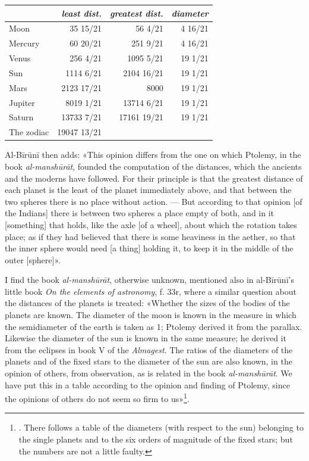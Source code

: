 \documentclass[11pt]{article}
\newcommand{\Pg}[1]{\marginpar{\footnotesize\color{gray}#1}}
\begin{document}
\Pg{I 288}\begin{center}\small\begin{tabular}{lrrr}
 & \emph{least dist.} & \emph{greatest dist.} & \emph{diameter} \\
\midrule
Moon & 35 15/21 & 56 4/21 & 4 16/21 \\
Mercury & 60 20/21 & 251 9/21 & 4 16/21 \\
Venus & 256 4/21 & 1095 5/21 & 19 1/21 \\
Sun & 1114 6/21 & 2104 16/21 & 19 1/21 \\
Mars & 2123 17/21 & 8000 & 19 1/21 \\
Jupiter & 8019 1/21 & 13714 6/21 & 19 1/21 \\
Saturn & 13733 7/21 & 17161 19/21 & 19 1/21 \\
The zodiac & 19047 13/21\footnotemark{} &  &  \\
\end{tabular}\end{center}
\addtocounter{footnote}{-1}
\par Al-Bīrūnī then adds: «This opinion differs from the one on which Ptolemy, in the book \emph{al-manshūrāt}, founded the computation of the distances, which the ancients and the moderns have followed. For their principle is that the greatest distance of each planet is the least of the planet immediately above, and that between the two spheres there is no place without action. — But according to that opinion [of the Indians] there is between two spheres a place empty of both, and in it [something] that holds, like the axle [of a wheel], about which the rotation takes place; as if they had believed that there is some heaviness in the aether, so that the inner sphere would need [a thing] holding it, to keep it in the middle of the outer [sphere]».\par
\par I find the book \emph{al-manshūrāt}, otherwise unknown, mentioned also in al-Bīrūnī's little book \emph{On the elements of astronomy}, f. 33r, where a similar question about the distances of the planets is treated: «Whether the sizes of the bodies of the planets are known. The diameter of the moon is known in the measure in which the semidiameter of the earth is taken as 1; Ptolemy derived it from the parallax. Likewise the diameter of the sun is known in the same measure; he derived it from the eclipses in book V of the \emph{Almagest}. The ratios of the diameters of the planets and of the fixed stars to the diameter of the sun are also known, in the opinion of others, from observation, as is related in the book \emph{al-manshūrāt}. We have put this in a table according to the opinion and finding of Ptolemy, since the opinions of others do not seem so firm to us»\footnote{. There follows a table of the diameters (with respect to the sun) belonging to the single planets and to the six orders of magnitude of the fixed stars; but the numbers are not a little faulty.}.\par
\end{document}
